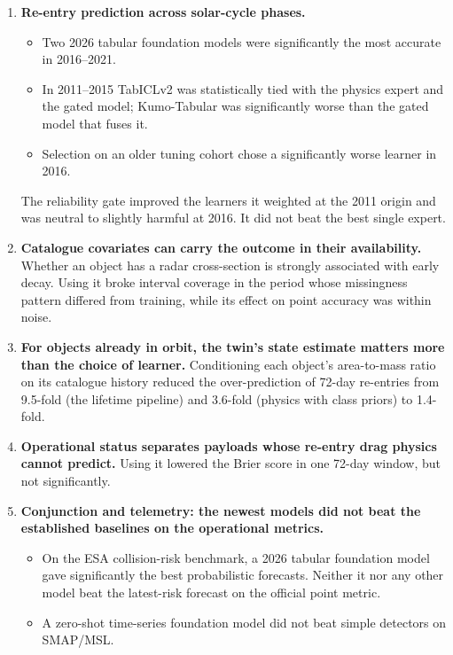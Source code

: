 \documentclass[
]{article}
\providecommand{\tightlist}{%
  \setlength{\itemsep}{0pt}\setlength{\parskip}{0pt}}
\begin{document}
\begin{enumerate}
\def\labelenumi{\arabic{enumi}.}
\tightlist
\item
  \textbf{Re-entry prediction across solar-cycle phases.}

  \begin{itemize}
  \tightlist
  \item
    Two 2026 tabular foundation models were significantly the most
    accurate in 2016--2021.
  \item
    In 2011--2015 TabICLv2 was statistically tied with the physics
    expert and the gated model; Kumo-Tabular was significantly worse
    than the gated model that fuses it.
  \item
    Selection on an older tuning cohort chose a significantly worse
    learner in 2016.
  \end{itemize}

  The reliability gate improved the learners it weighted at the 2011
  origin and was neutral to slightly harmful at 2016. It did not beat
  the best single expert.
\item
  \textbf{Catalogue covariates can carry the outcome in their
  availability.} Whether an object has a radar cross-section is strongly
  associated with early decay. Using it broke interval coverage in the
  period whose missingness pattern differed from training, while its
  effect on point accuracy was within noise.
\item
  \textbf{For objects already in orbit, the twin's state estimate
  matters more than the choice of learner.} Conditioning each object's
  area-to-mass ratio on its catalogue history reduced the
  over-prediction of 72-day re-entries from 9.5-fold (the lifetime
  pipeline) and 3.6-fold (physics with class priors) to 1.4-fold.
\item
  \textbf{Operational status separates payloads whose re-entry drag
  physics cannot predict.} Using it lowered the Brier score in one
  72-day window, but not significantly.
\item
  \textbf{Conjunction and telemetry: the newest models did not beat the
  established baselines on the operational metrics.}

  \begin{itemize}
  \tightlist
  \item
    On the ESA collision-risk benchmark, a 2026 tabular foundation model
    gave significantly the best probabilistic forecasts. Neither it nor
    any other model beat the latest-risk forecast on the official point
    metric.
  \item
    A zero-shot time-series foundation model did not beat simple
    detectors on SMAP/MSL.
  \end{itemize}
\end{enumerate}
\end{document}

